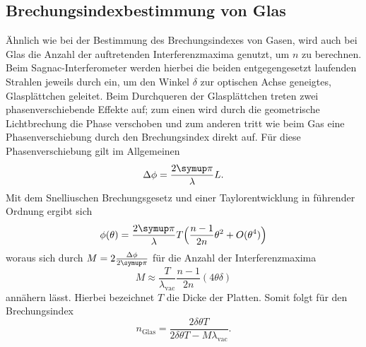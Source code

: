 \subsection{Brechungsindexbestimmung von Glas}
Ähnlich wie bei der Bestimmung des Brechungsindexes von Gasen, wird auch bei Glas die Anzahl der auftretenden Interferenzmaxima genutzt, um $n$ zu berechnen. Beim Sagnac-Interferometer
werden hierbei die beiden entgegengesetzt laufenden Strahlen jeweils durch ein, um den Winkel $\delta$ zur optischen Achse geneigtes, Glasplättchen geleitet. Beim Durchqueren
der Glasplättchen treten zwei phasenverschiebende Effekte auf; zum einen wird durch die geometrische Lichtbrechung die Phase verschoben und zum anderen tritt wie beim
Gas eine Phasenverschiebung durch den Brechungsindex direkt auf.
Für diese Phasenverschiebung gilt im Allgemeinen
\begin{equation}
  \Delta \phi = \frac{2\pii}{\lambda}L.
\end{equation}
Mit dem Snelliuschen Brechungsgesetz und einer Taylorentwicklung in führender Ordnung ergibt sich
\begin{equation}
  \phi(\theta)=\frac{2\pii}{\lambda}T\Bigl(\frac{n-1}{2n}\theta^2+O(\theta^4)\Bigr)
\end{equation}
woraus sich durch $M=2\frac{\Delta \phi}{2\pii}$ für die Anzahl der Interferenzmaxima
\begin{equation}
  M \approx \frac{T}{\lambda_{\text{vac}}}\frac{n-1}{2n}(4\theta \delta)
\end{equation}
annähern lässt. Hierbei bezeichnet $T$ die Dicke der Platten. Somit folgt für den Brechungsindex
\begin{equation}
  n_\text{Glas}=\frac{2\delta \theta T}{2\delta \theta T - M\lambda_\text{vac}}.
  \label{eq:glas}
\end{equation}
